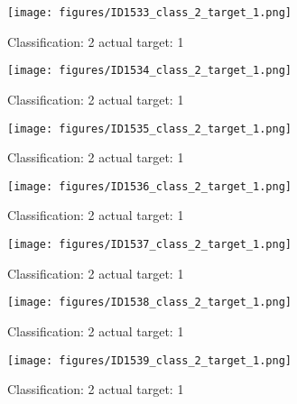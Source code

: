 \begin{figure}[h!]
\begin{center}
\texttt{[image: figures/ID1533\_class\_2\_target\_1.png]}
\end{center}
\caption{ Classification: 2 actual target: 1}
\label{fig:ID1533_class_2_target_1}
\end{figure}
\begin{figure}[h!]
\begin{center}
\texttt{[image: figures/ID1534\_class\_2\_target\_1.png]}
\end{center}
\caption{ Classification: 2 actual target: 1}
\label{fig:ID1534_class_2_target_1}
\end{figure}
\begin{figure}[h!]
\begin{center}
\texttt{[image: figures/ID1535\_class\_2\_target\_1.png]}
\end{center}
\caption{ Classification: 2 actual target: 1}
\label{fig:ID1535_class_2_target_1}
\end{figure}
\begin{figure}[h!]
\begin{center}
\texttt{[image: figures/ID1536\_class\_2\_target\_1.png]}
\end{center}
\caption{ Classification: 2 actual target: 1}
\label{fig:ID1536_class_2_target_1}
\end{figure}
\begin{figure}[h!]
\begin{center}
\texttt{[image: figures/ID1537\_class\_2\_target\_1.png]}
\end{center}
\caption{ Classification: 2 actual target: 1}
\label{fig:ID1537_class_2_target_1}
\end{figure}
\begin{figure}[h!]
\begin{center}
\texttt{[image: figures/ID1538\_class\_2\_target\_1.png]}
\end{center}
\caption{ Classification: 2 actual target: 1}
\label{fig:ID1538_class_2_target_1}
\end{figure}
\begin{figure}[h!]
\begin{center}
\texttt{[image: figures/ID1539\_class\_2\_target\_1.png]}
\end{center}
\caption{ Classification: 2 actual target: 1}
\label{fig:ID1539_class_2_target_1}
\end{figure}
